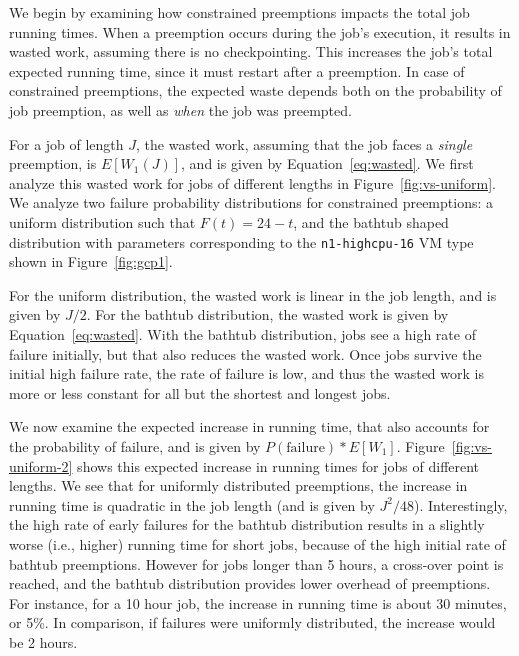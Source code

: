 We begin by examining how constrained preemptions impacts the total job running times. 
When a preemption occurs during the job's execution, it results in wasted work, assuming there is no checkpointing. 
This increases the job's total expected running time, since it must restart after a preemption.
In case of constrained preemptions, the expected waste depends both on the probability of job preemption, as well as \emph{when} the job was preempted. 


For a job of length $J$, the wasted work, assuming that the job faces a \emph{single} preemption, is $E[W_1(J)]$, and is given by Equation~\ref{eq:wasted}.
We first analyze this wasted work for jobs of different lengths in Figure~\ref{fig:vs-uniform}. 
We analyze two failure probability distributions for constrained preemptions: a uniform distribution such that $F(t) = 24-t$, and the bathtub shaped distribution with parameters corresponding to the \texttt{n1-highcpu-16} VM type shown in Figure~\ref{fig:gcp1}. 


For the uniform distribution, the wasted work is linear in the job length, and is given by $J/2$.
For the bathtub distribution, the wasted work is given by Equation~\ref{eq:wasted}.  %
With the bathtub distribution, jobs see a high rate of failure initially, but that also reduces the wasted work. 
Once jobs survive the initial high failure rate, the rate of failure is low, and thus the wasted work is more or less constant for all but the shortest and longest jobs. 



We now examine the expected increase in running time, that also accounts for the probability of failure, and is given by $P(\text{failure})*E[W_1]$. 
Figure~\ref{fig:vs-uniform-2} shows this expected increase in running times for jobs of different lengths.
We see that for uniformly distributed preemptions, the increase in running time is quadratic in the job length (and is given by $J^2/48$). 
Interestingly, the high rate of early failures for the bathtub distribution results in a slightly worse (i.e., higher) running time for short jobs, because of the high initial rate of bathtub preemptions. 
However for jobs longer than 5 hours, a cross-over point is reached, and the bathtub distribution provides lower overhead of preemptions.
For instance, for a 10 hour job, the increase in running time is about 30 minutes, or 5\%. 
In comparison, if failures were uniformly distributed, the increase would be 2 hours. 



